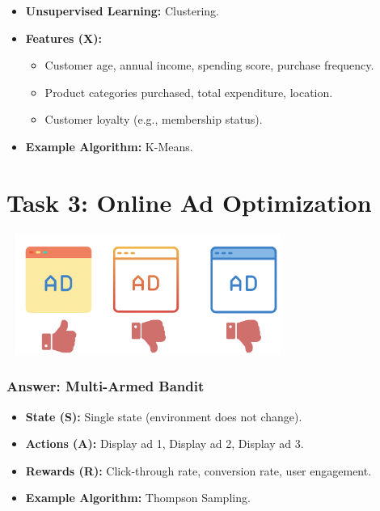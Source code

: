 \documentclass[
  letterpaper,
  DIV=11,
  numbers=noendperiod]{scrreprt}
\providecommand{\tightlist}{%
  \setlength{\itemsep}{0pt}\setlength{\parskip}{0pt}}\usepackage{longtable,booktabs,array}
\begin{document}
\begin{itemize}
\tightlist
\item
  \textbf{Unsupervised Learning:} Clustering.
\item
  \textbf{Features (X):}

  \begin{itemize}
  \tightlist
  \item
    Customer age, annual income, spending score, purchase frequency.
  \item
    Product categories purchased, total expenditure, location.
  \item
    Customer loyalty (e.g., membership status).
  \end{itemize}
\item
  \textbf{Example Algorithm:} K-Means.
\end{itemize}

\section{Task 3: Online Ad
Optimization}\label{task-3-online-ad-optimization}

\includegraphics[width=3.64583in,height=1.5625in]{lecture12/images/MultiArmedBandit.png}

\subsubsection{Answer: Multi-Armed
Bandit}\label{answer-multi-armed-bandit}

\begin{itemize}
\tightlist
\item
  \textbf{State (S):} Single state (environment does not change).
\item
  \textbf{Actions (A):} Display ad 1, Display ad 2, Display ad 3.
\item
  \textbf{Rewards (R):} Click-through rate, conversion rate, user
  engagement.
\item
  \textbf{Example Algorithm:} Thompson Sampling.
\end{itemize}
\end{document}
